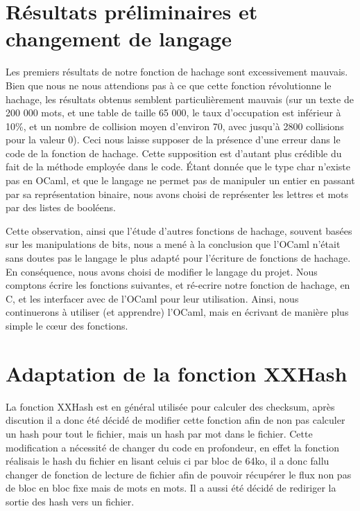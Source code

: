 \documentclass[final,twoside,article,10pt]{scrartcl}
\begin{document}
\section{Résultats préliminaires et changement de langage}
    Les premiers résultats de notre fonction de hachage sont excessivement mauvais.
    Bien que nous ne nous attendions pas à ce que cette fonction révolutionne le hachage, les résultats obtenus semblent particulièrement mauvais (sur un texte de 200 000 mots, et une table de taille 65 000, le taux d'occupation est inférieur à 10\%, et un nombre de collision moyen d'environ 70, avec jusqu'à 2800 collisions pour la valeur 0).
    Ceci nous laisse supposer de la présence d'une erreur dans le code de la fonction de hachage.
    Cette supposition est d'autant plus crédible du fait de la méthode employée dans le code.
    \'Etant donnée que le type char n'existe pas en OCaml, et que le langage ne permet pas de manipuler un entier en passant par sa représentation binaire, nous avons choisi de représenter les lettres et mots par des listes de booléens.
    \par Cette observation, ainsi que l'étude d'autres fonctions de hachage, souvent basées sur les manipulations de bits, nous a mené à la conclusion que l'OCaml n'était sans doutes pas le langage le plus adapté pour l'écriture de fonctions de hachage. En conséquence, nous avons choisi de modifier le langage du projet.
    Nous comptons écrire les fonctions suivantes, et ré-ecrire notre fonction de hachage, en C, et les interfacer avec de l'OCaml pour leur utilisation.
    Ainsi, nous continuerons à utiliser (et apprendre) l'OCaml, mais en écrivant de manière plus simple le c\oe ur des fonctions.
    
    \section{Adaptation de la fonction XXHash}
    La fonction XXHash est en général utilisée pour calculer des checksum, après discution il a donc été décidé de modifier 
    cette fonction afin de non pas calculer un hash pour tout le fichier, mais un hash par mot dans le fichier. Cette modification a nécessité de changer du code en profondeur, en effet la fonction réalisais le hash du fichier en lisant celuis ci par bloc de 64ko, il a donc fallu changer de fonction de lecture de fichier afin de pouvoir récupérer le flux non pas de bloc en bloc fixe mais de mots en mots. Il a aussi été décidé de rediriger la sortie des hash vers un fichier.
\end{document}
